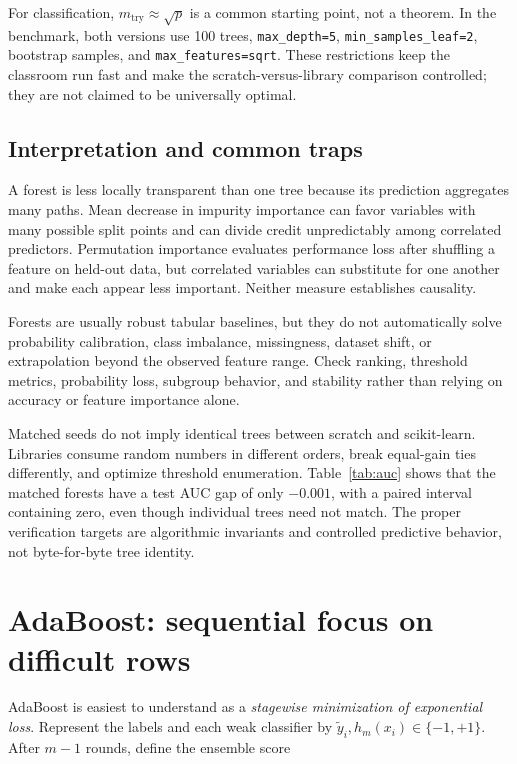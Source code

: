 \documentclass[11pt]{article}
\newcommand{\code}[1]{\texttt{#1}}
\begin{document}
For classification, $m_{\mathrm{try}}\approx\sqrt p$ is a common starting
point, not a theorem. In the benchmark, both versions use 100 trees,
\code{max\_depth=5}, \code{min\_samples\_leaf=2}, bootstrap samples, and
\code{max\_features=sqrt}. These restrictions keep the classroom run fast and
make the scratch-versus-library comparison controlled; they are not claimed to
be universally optimal.

\subsection{Interpretation and common traps}

A forest is less locally transparent than one tree because its prediction
aggregates many paths. Mean decrease in impurity importance can favor variables
with many possible split points and can divide credit unpredictably among
correlated predictors. Permutation importance evaluates performance loss after
shuffling a feature on held-out data, but correlated variables can substitute
for one another and make each appear less important. Neither measure establishes
causality.

Forests are usually robust tabular baselines, but they do not automatically
solve probability calibration, class imbalance, missingness, dataset shift, or
extrapolation beyond the observed feature range. Check ranking, threshold
metrics, probability loss, subgroup behavior, and stability rather than relying
on accuracy or feature importance alone.

Matched seeds do not imply identical trees between scratch and scikit-learn.
Libraries consume random numbers in different orders, break equal-gain ties
differently, and optimize threshold enumeration. Table~\ref{tab:auc} shows that
the matched forests have a test AUC gap of only $-0.001$, with a paired interval
containing zero, even though individual trees need not match. The proper
verification targets are algorithmic invariants and controlled predictive
behavior, not byte-for-byte tree identity.

\section{AdaBoost: sequential focus on difficult rows}

AdaBoost is easiest to understand as a \emph{stagewise minimization of
exponential loss}. Represent the labels and each weak classifier by
$\tilde y_i,h_m(x_i)\in\{-1,+1\}$. After $m-1$ rounds, define the ensemble
score
\end{document}
